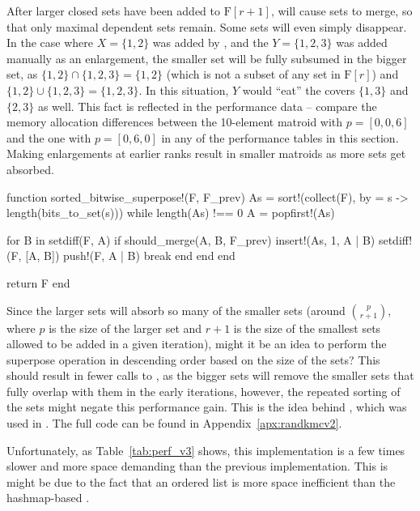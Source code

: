 After larger closed sets have been added to $\mathrm{F}[r+1]$,  will cause sets to merge, so that only maximal dependent sets remain. Some sets will even simply disappear. In the case where $X=\{1,2\}$ was added by , and the $Y=\{1,2,3\}$ was added manually as an enlargement, the smaller set will be fully subsumed in the bigger set, as $\{1,2\}\cap\{1,2,3\}=\{1,2\}$ (which is not a subset of any set in $\mathrm{F}[r]$) and $\{1,2\}\cup\{1,2,3\}=\{1,2,3\}$. In this situation, $Y$ would ``eat'' the covers $\{1,3\}$ and $\{2,3\}$ as well. This fact is reflected in the performance data -- compare the memory allocation differences between the 10-element matroid with $p=[0,0,6]$ and the one with $p=[0,6,0]$ in any of the performance tables in this section. Making enlargements at earlier ranks result in smaller matroids as more sets get absorbed.

\begin{jllisting}
function sorted_bitwise_superpose!(F, F_prev)
  As = sort!(collect(F), by = s -> length(bits_to_set(s)))
  while length(As) !== 0
    A = popfirst!(As)

    for B in setdiff(F, A)
      if should_merge(A, B, F_prev)
        insert!(As, 1, A | B)
        setdiff!(F, [A, B])
        push!(F, A | B)
        break
      end
    end
  end

  return F
end
\end{jllisting}

Since the larger sets will absorb so many of the smaller sets (around $\binom{p}{r+1}$, where $p$ is the size of the larger set and $r+1$ is the size of the smallest sets allowed to be added in a given iteration), might it be an idea to perform the superpose operation in descending order based on the size of the sets? This should result in fewer calls to , as the bigger sets will remove the smaller sets that fully overlap with them in the early iterations, however, the repeated sorting of the sets might negate this performance gain. This is the idea behind , which was used in . The full code can be found in Appendix~\ref{apx:randkmcv2}.

Unfortunately, as Table~\ref{tab:perf_v3} shows, this implementation is a few times slower and more space demanding than the previous implementation. This is might be due to the fact that an ordered list is more space inefficient than the hashmap-based .

